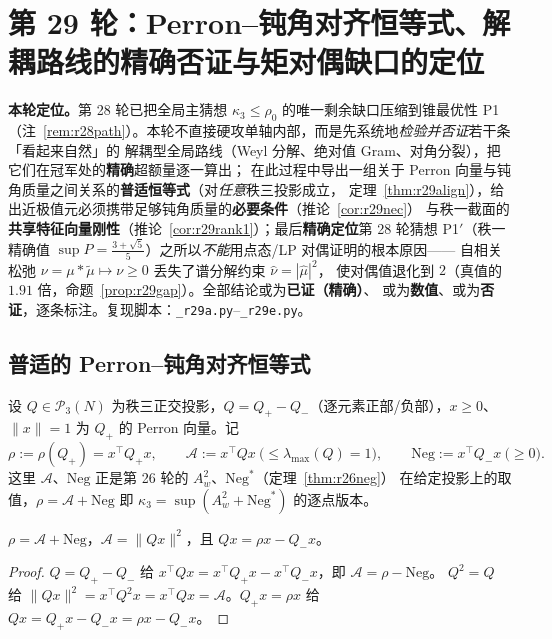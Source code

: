 \section{第 29 轮：Perron--钝角对齐恒等式、解耦路线的精确否证与矩对偶缺口的定位}\label{sec:r29}

\textbf{本轮定位。}第 28 轮已把全局主猜想 $\kappa_3\le\rho_0$ 的唯一剩余缺口压缩到锥最优性 P1
（注~\ref{rem:r28path}）。本轮不直接硬攻单轴内部，而是先系统地\emph{检验并否证}若干条「看起来自然」的
解耦型全局路线（Weyl 分解、绝对值 Gram、对角分裂），把它们在冠军处的\textbf{精确}超额量逐一算出；
在此过程中导出一组关于 Perron 向量与钝角质量之间关系的\textbf{普适恒等式}（对\emph{任意}秩三投影成立，
定理~\ref{thm:r29align}），给出近极值元必须携带足够钝角质量的\textbf{必要条件}（推论~\ref{cor:r29nec}）
与秩一截面的\textbf{共享特征向量刚性}（推论~\ref{cor:r29rank1}）；最后\textbf{精确定位}第 28 轮猜想
P1$'$（秩一精确值 $\sup P=\frac{3+\sqrt5}5$）之所以\emph{不能}用点态/LP 对偶证明的根本原因——
自相关松弛 $\nu=\mu*\widetilde\mu\mapsto\nu\ge0$ 丢失了谱分解约束 $\widehat\nu=|\widehat\mu|^2$，
使对偶值退化到 $2$（真值的 $1.91$ 倍，命题~\ref{prop:r29gap}）。全部结论或为\textbf{已证（精确）}、
或为\textbf{数值}、或为\textbf{否证}，逐条标注。复现脚本：\texttt{\_r29a.py}--\texttt{\_r29e.py}。

\subsection{普适的 Perron--钝角对齐恒等式}\label{sec:r29:ident}

设 $Q\in\mathcal P_3(N)$ 为秩三正交投影，$Q=Q_+-Q_-$（逐元素正部/负部），$x\ge0$、$\|x\|=1$
为 $Q_+$ 的 Perron 向量。记
\begin{equation}\label{eq:r29defs}
\rho:=\rho(Q_+)=x^\top Q_+x,\qquad
\mathcal A:=x^\top Qx\ \bigl(\le\lambda_{\max}(Q)=1\bigr),\qquad
\mathrm{Neg}:=x^\top Q_-x\ \bigl(\ge0\bigr).
\end{equation}
这里 $\mathcal A$、$\mathrm{Neg}$ 正是第 26 轮的 $A_w^2$、$\mathrm{Neg}^*$（定理~\ref{thm:r26neg}）
在给定投影上的取值，$\rho=\mathcal A+\mathrm{Neg}$ 即 $\kappa_3=\sup(A_w^2+\mathrm{Neg}^*)$ 的逐点版本。

\begin{lemma}[基本分解，已证]\label{lem:r29basic}
$\rho=\mathcal A+\mathrm{Neg}$，$\mathcal A=\|Qx\|^2$，且 $Qx=\rho x-Q_-x$。
\end{lemma}
\begin{proof}
$Q=Q_+-Q_-$ 给 $x^\top Qx=x^\top Q_+x-x^\top Q_-x$，即 $\mathcal A=\rho-\mathrm{Neg}$。
$Q^2=Q$ 给 $\|Qx\|^2=x^\top Q^2x=x^\top Qx=\mathcal A$。$Q_+x=\rho x$ 给
$Qx=Q_+x-Q_-x=\rho x-Q_-x$。
\end{proof}

